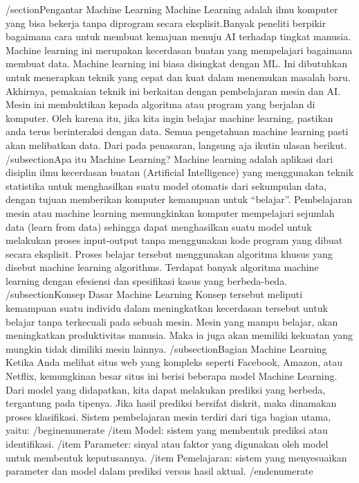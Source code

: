 /section{Pengantar Machine Learning}
Machine Learning adalah ilmu komputer yang bisa bekerja tanpa diprogram secara eksplisit.Banyak peneliti berpikir bagaimana cara untuk membuat kemajuan menuju AI terhadap tingkat manusia. Machine learning ini merupakan kecerdasan buatan yang mempelajari bagaimana membuat data. Machine learning ini biasa disingkat dengan ML. Ini dibutuhkan untuk menerapkan teknik yang cepat dan kuat dalam menemukan masalah baru.
Akhirnya, pemakaian teknik ini berkaitan dengan pembelajaran mesin dan AI. Mesin ini membuktikan kepada algoritma atau program yang berjalan di komputer. Oleh karena itu, jika kita ingin belajar machine learning, pastikan anda terus berinteraksi dengan data. Semua pengetahuan machine learning pasti akan melibatkan data. Dari pada penasaran, langsung aja ikutin ulasan berikut.
/subsection{Apa itu Machine Learning?}
Machine learning adalah aplikasi dari disiplin ilmu kecerdasan buatan (Artificial Intelligence) yang menggunakan teknik statistika untuk menghasilkan suatu model otomatis dari sekumpulan data, dengan tujuan memberikan komputer kemampuan untuk “belajar”. Pembelajaran mesin atau machine learning memungkinkan komputer mempelajari sejumlah data (learn from data) sehingga dapat menghasilkan suatu model untuk melakukan proses input-output tanpa menggunakan kode program yang dibuat secara eksplisit. Proses belajar tersebut menggunakan algoritma khusus yang disebut machine learning algorithms. Terdapat banyak algoritma machine learning dengan efesiensi dan spesifikasi kasus yang berbeda-beda.
/subsection{Konsep Dasar Machine Learning}
Konsep tersebut meliputi kemampuan suatu individu dalam meningkatkan kecerdasan tersebut untuk belajar tanpa terkecuali pada sebuah mesin. Mesin yang mampu belajar, akan meningkatkan produktivitas manusia. Maka ia juga akan memiliki kekuatan yang mungkin tidak dimiliki mesin lainnya.
/subsection{Bagian Machine Learning}
Ketika Anda melihat situs web yang kompleks seperti Facebook, Amazon, atau Netflix, kemungkinan besar situs ini berisi beberapa model Machine Learning. Dari model yang didapatkan, kita dapat melakukan prediksi yang berbeda, tergantung pada tipenya. Jika hasil prediksi bersifat diskrit, maka dinamakan proses klasifikasi. Sistem pembelajaran mesin terdiri dari tiga bagian utama, yaitu:
/begin{enumerate}
/item Model: sistem yang membentuk prediksi atau identifikasi.
/item Parameter: sinyal atau faktor yang digunakan oleh model untuk membentuk keputusannya.
/item Pemelajaran: sistem yang menyesuaikan parameter dan model dalam prediksi versus hasil aktual.
/end{enumerate}
